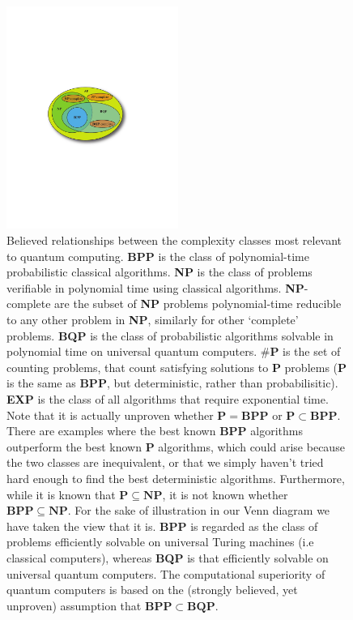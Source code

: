 \begin{figure}[!htbp]
	\includegraphics[width=0.5\textwidth]{complexity_classes}     
	\vspace{-1.2em} \captionspacefig \caption{Believed relationships between the complexity classes most relevant to quantum computing. \textbf{BPP} is the class of polynomial-time probabilistic classical algorithms. \textbf{NP} is the class of problems verifiable in polynomial time using classical algorithms. \textbf{NP}-complete are the subset of \textbf{NP} problems polynomial-time reducible to any other problem in \textbf{NP}, similarly for other `complete' problems. \textbf{BQP} is the class of probabilistic algorithms solvable in polynomial time on universal quantum computers. $\#\mathbf{P}$ is the set of counting problems, that count satisfying solutions to \textbf{P} problems (\textbf{P} is the same as \textbf{BPP}, but deterministic, rather than probabilisitic). \textbf{EXP} is the class of all algorithms that require exponential time. Note that it is actually unproven whether \mbox{$\mathbf{P}=\mathbf{BPP}$} or \mbox{$\mathbf{P}\subset\mathbf{BPP}$}. There are examples where the best known \textbf{BPP} algorithms outperform the best known \textbf{P} algorithms, which could arise because the two classes are inequivalent, or that we simply haven't tried hard enough to find the best deterministic algorithms. Furthermore, while it is known that \mbox{$\mathbf{P}\subseteq\mathbf{NP}$}, it is not known whether \mbox{$\mathbf{BPP}\subseteq\mathbf{NP}$}. For the sake of illustration in our Venn diagram we have taken the view that it is. \textbf{BPP} is regarded as the class of problems efficiently solvable on universal Turing machines (i.e classical computers), whereas \textbf{BQP} is that efficiently solvable on universal quantum computers. The computational superiority of quantum computers is based on the (strongly believed, yet unproven) assumption that \mbox{$\mathbf{BPP}\subset\mathbf{BQP}$}.} \label{fig:complexity_classes}
\end{figure}


